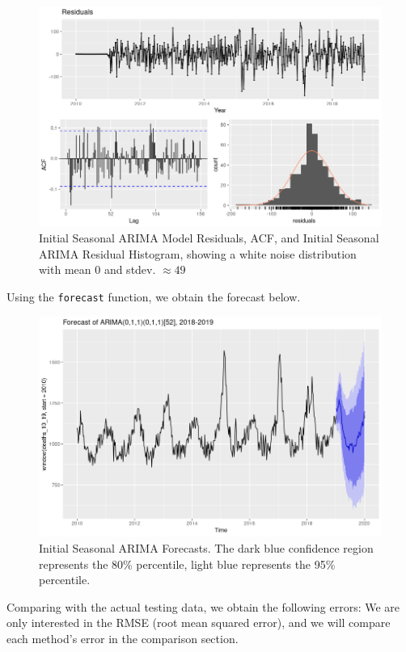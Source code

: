 \documentclass[a4paper, oneside]{discothesis}
\begin{document}
\begin{figure}[H]
\centering
\includegraphics[width=.75\textwidth]{figures/arima_init_resid_acf.png}
\caption{Initial Seasonal ARIMA Model Residuals, ACF, and Initial Seasonal ARIMA Residual Histogram, showing a white noise distribution with mean $0$ and stdev. $\approx 49$}
\end{figure}

Using the \texttt{forecast} function, we obtain the forecast below.
\begin{figure}[H]
\centering
\includegraphics[width=.8\textwidth]{figures/arima_init_forecast.png}
\caption{Initial Seasonal ARIMA Forecasts. The dark blue confidence region represents the 80\% percentile, light blue represents the 95\% percentile.}
\end{figure}
Comparing with the actual testing data, we obtain the following errors:
We are only interested in the RMSE (root mean squared error), and we will compare each method's error in the comparison section.
\end{document}

